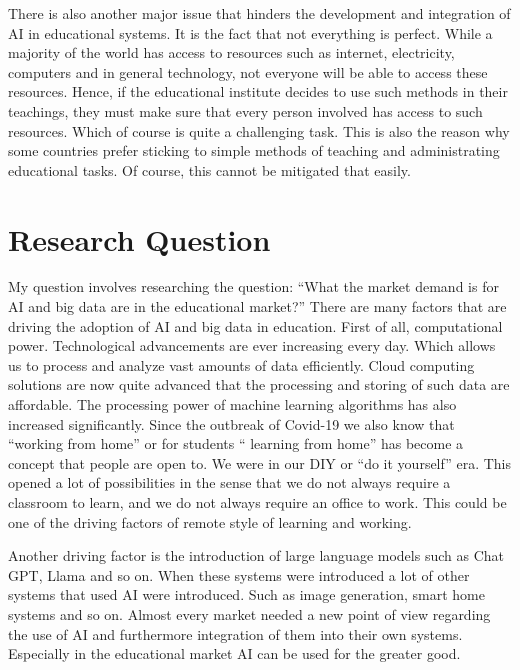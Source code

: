 \documentclass{imc-inf}
\begin{document}
There is also another major issue that hinders the development and integration of AI in educational systems. It is the fact that not everything is perfect. While a majority of the world has access to resources such as internet, electricity, computers and in general technology, not everyone will be able to access these resources. Hence, if the educational institute decides to use such methods in their teachings, they must make sure that every person involved has access to such resources. Which of course is quite a challenging task. This is also the reason why some countries prefer sticking to simple methods of teaching and administrating educational tasks. Of course, this cannot be mitigated that easily. 


\section{Research Question }
My question involves researching the question: “What the market demand is for AI and big data are in the educational market?” There are many factors that are driving the adoption of AI and big data in education. First of all, computational power. Technological advancements are ever increasing every day. Which allows us to process and analyze vast amounts of data efficiently. Cloud computing solutions are now quite advanced that the processing and storing of such data are affordable. The processing power of machine learning algorithms has also increased significantly. 
Since the outbreak of Covid-19 we also know that “working from home” or for students “ learning from home” has become a concept that people are open to. We were in our DIY or “do it yourself” era. This opened a lot of possibilities in the sense that we do not always require a classroom to learn, and we do not always require an office to work. This could be one of the driving factors of remote style of learning and working. 

Another driving factor is the introduction of large language models such as Chat GPT, Llama and so on. When these systems were introduced a lot of other systems that used AI were introduced. Such as image generation, smart home systems and so on. Almost every market needed a new point of view regarding the use of AI and furthermore integration of them into their own systems. Especially in the educational market AI can be used for the greater good. 
\end{document}
